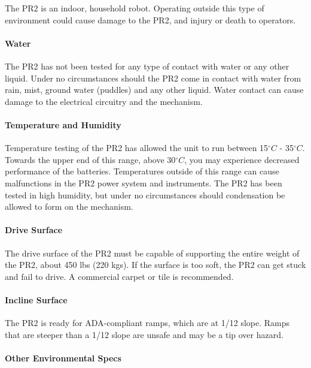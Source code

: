 The PR2 is an indoor, household robot. Operating outside this type of environment could cause damage to the PR2, and  injury or death to operators.

\paragraph{Water}

The PR2 has not been tested for any type of contact with water or any other
liquid. Under no circumstances should the PR2 come in contact with water from
rain, mist, ground water (puddles) and any other liquid. Water contact can cause
damage to the electrical circuitry and the mechanism.

\paragraph{Temperature and Humidity}


Temperature testing of the PR2 has allowed the unit to run between 15$^{\circ}C$ - 35$^{\circ}C$. 
Towards the upper end of this range, above 30$^{\circ}C$, you may experience decreased performance of the batteries.
Temperatures outside of this range can cause malfunctions in the PR2 power
system and instruments. The PR2 has been tested in high humidity, but under no
circumstances should condensation be allowed to form on the mechanism.

\paragraph{Drive Surface}

The drive surface of the PR2 must be capable of supporting the entire weight of
the PR2, about 450 lbs (220 kgs). If the surface is too soft, the PR2 can get
stuck and fail to drive. A commercial carpet or tile is recommended.

\paragraph{Incline Surface}

The PR2 is ready for ADA-compliant ramps, which are at 1/12 slope. Ramps that
are steeper than a 1/12 slope are unsafe and may be a tip over hazard.

\paragraph{Other Environmental Specs}

